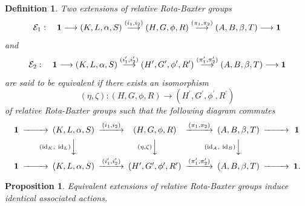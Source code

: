 \documentclass[11pt]{amsart}
\theoremstyle{thrm}
\theoremstyle{plain}
\newtheorem{prop}[thm]{Proposition}
\newtheorem{defn}[thm]{Definition}
\theoremstyle{definition}
\newcommand{\Id}{\operatorname{id}}
\numberwithin{equation}{section}
\begin{document}
\begin{defn}
Two extensions of relative Rota-Baxter groups 
	$$\mathcal{E}_1 : \quad  {\bf 1} \longrightarrow (K,L,\alpha,S ) \stackrel{(i_1, i_2)}{\longrightarrow}  (H,G, \phi, R) \stackrel{(\pi_1, \pi_2)}{\longrightarrow} (A,B, \beta, T) \longrightarrow {\bf 1}$$
	and $$\mathcal{E}_2 : \quad {\bf 1} \longrightarrow (K,L,\alpha,S ) \stackrel{(i^\prime_1, i^\prime_2)}{\longrightarrow}  (H^\prime,G^\prime, \phi^\prime, R^\prime) \stackrel{(\pi^\prime_1, \pi^\prime_2)}{\longrightarrow} (A,B, \beta, T) \longrightarrow {\bf 1}$$
are said to be equivalent if there exists an isomorphism $$(\eta, \zeta):(H,G, \phi, R) \longrightarrow (H^\prime,G^\prime, \phi^\prime, R^\prime) $$
of relative Rota-Baxter groups  such that the following diagram commutes
	\begin{align}
	\begin{CD}\label{eqact}
		{\bf 1} @>>> (K,L,\alpha,S ) @>(i_1, i_2)>> (H,G, \phi, R) @>{{(\pi_1, \pi_2)} }>> (A,B, \beta, T) @>>> {\bf 1}\\ 
		&& @V{(\Id_K, ~\Id_L)} VV@V{(\eta, \zeta)} VV @V{(\Id_A, ~\Id_B)}VV \\
		{\bf 1} @>>> (K,L,\alpha,S ) @>(i^\prime_1, i^\prime_2)>>(H^\prime,G^\prime, \phi^\prime, R^\prime) @>{(\pi^\prime_1, \pi^\prime_2) }>> (A,B, \beta, T) @>>> {\bf 1}.
	\end{CD}
\end{align}
\end{defn}

\begin{prop}\label{eqactprop}
Equivalent extensions of relative Rota-Baxter groups induce identical associated actions.
\end{prop}
\end{document}
